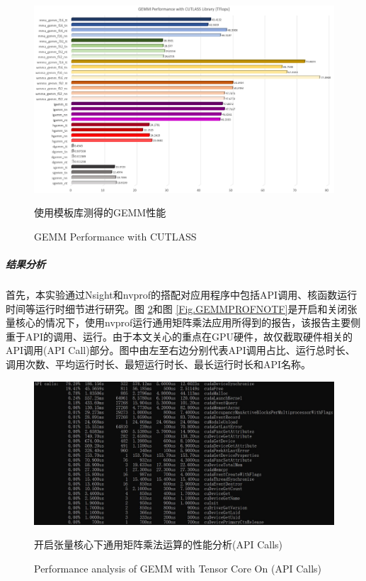 \begin{figure}
	\centering
	\includegraphics[width=15cm]{figures/CUTLASSGEMM.jpg}
	\renewcommand{\thefigure}{\arabic{section}-\arabic{figure} }
	\renewcommand{\figurename}{图}
	\caption{使用模板库测得的GEMM性能}
	\addtocounter{figure}{-1}
	\renewcommand{\thefigure}{\arabic{section}-\arabic{figure} }
	\renewcommand{\figurename}{Figure}
	\caption{GEMM Performance with CUTLASS}
	\label{Fig-GEMM-CUTLASS}
\end{figure}
\subparagraph{结果分析}
\par 首先，本实验通过Nsight和nvprof的搭配对应用程序中包括API调用、核函数运行时间等运行时细节进行研究。图 \ref{Fig.GEMMPROFTF}和图 \ref{Fig.GEMMPROFNOTF}是开启和关闭张量核心的情况下，使用nvprof运行通用矩阵乘法应用所得到的报告，该报告主要侧重于API的调用、运行。由于本文关心的重点在GPU硬件，故仅截取硬件相关的API调用(API Call)部分。图中由左至右边分别代表API调用占比、运行总时长、调用次数、平均运行时长、最短运行时长、最长运行时长和API名称。
\begin{figure}
	\centering
	\includegraphics[width=15cm]{figures/GEMM-TF.jpg}
	\renewcommand{\thefigure}{\arabic{section}-\arabic{figure} }
	\renewcommand{\figurename}{图}
	\caption{开启张量核心下通用矩阵乘法运算的性能分析(API Calls)}
	\addtocounter{figure}{-1}
	\renewcommand{\thefigure}{\arabic{section}-\arabic{figure} }
	\renewcommand{\figurename}{Figure}
	\caption{Performance analysis of GEMM with Tensor Core On (API Calls)}
	\label{Fig.GEMMPROFTF}
\end{figure}
